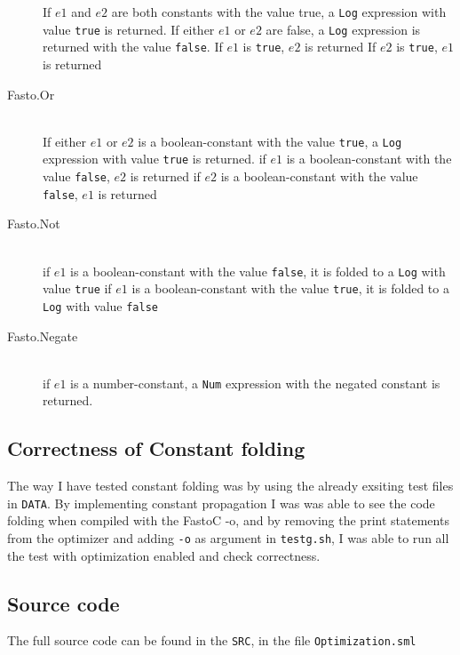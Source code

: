 \documentclass[11pt,a4paper]{article}
\begin{document}
\begin{description}
      If $e1$ and $e2$ are both constants with the value true, a \texttt{Log} expression with value \texttt{true} is returned.
      If either $e1$ or $e2$ are false, a \texttt{Log} expression is returned with the value \texttt{false}. 
      If $e1$ is \texttt{true}, $e2$ is returned
      If $e2$ is \texttt{true}, $e1$ is returned
  \item[Fasto.Or] \hfill \\
      If either $e1$ or $e2$ is a boolean-constant with the value \texttt{true}, a \texttt{Log} expression with value \texttt{true} is returned.
      if $e1$ is a boolean-constant with the value \texttt{false}, $e2$ is returned
      if $e2$ is a boolean-constant with the value \texttt{false}, $e1$ is returned
  \item[Fasto.Not] \hfill \\
      if $e1$ is a boolean-constant with the value \texttt{false}, it is folded to a \texttt{Log} with value \texttt{true}
      if $e1$ is a boolean-constant with the value \texttt{true}, it is folded to a \texttt{Log} with value \texttt{false}
  \item[Fasto.Negate] \hfill \\
      if $e1$ is a number-constant, a \texttt{Num} expression with the negated constant is returned.
      
\end{description}

\subsection{Correctness of Constant folding}
The way I have tested constant folding was by using the already exsiting
test files in \texttt{DATA}. By implementing constant propagation I was was
able to see the code folding when compiled with the FastoC -o, and by removing
the print statements from the optimizer and adding \texttt{-o} as argument in
\texttt{testg.sh}, I was able to run all the test with optimization enabled and check
correctness.

\subsection{Source code}
The full source code can be found in the \texttt{SRC}, in the file \texttt{Optimization.sml}
\end{document}
